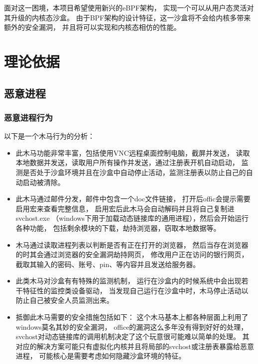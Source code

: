 \documentclass[AutoFakeBold,a4paper]{ctexart}
\begin{document}
面对这一困境，本项目希望使用新兴的eBPF架构，
实现一个可以从用户态灵活对其升级的内核态沙盒。
由于BPF架构的设计特征，这一沙盒将不会给内核多带来额外的安全漏洞，
并且将可以实现和内核态相仿的性能。

\section{理论依据}

\subsection{恶意进程}

\subsubsection{恶意进程行为}

以下是一个木马行为的分析：\cite{ZeuS2018}

\begin{itemize}
    \item 此木马功能非常丰富，包括使用VNC远程桌面控制电脑，截屏并发送，
    读取本地数据并发送，读取用户所有操作并发送，通过注册表开机自动启动，
    监测是否处于沙盒环境并且在沙盒中自动停止活动，监测注册表以防止自己的自动启动被清除。

    \item 此木马通过邮件分发，邮件中包含一个doc文件链接，
    打开后offic会提示需要启用宏来查看完整信息，
    启用宏后此木马会自动解码并且将自己复制进svchost.exe
    （windows下用于加载动态链接库的通用进程），然后会开始运行各种功能，
    包括剩余模块的下载，劫持浏览器，窃取本地数据等。
    
    \item 木马通过读取进程列表以判断是否有正在打开的浏览器，
    然后当存在浏览器的时其会通过浏览器的安全漏洞劫持网页，
    修改用户正在访问的银行网页，截取其输入的密码、账号、pin、等内容并且发送给服务器。
    
    \item 此类木马对沙盒有有特殊的监测机制，
    运行在沙盒内的时候系统中会出现若干特征性的监控类设备驱动，
    当发现自己运行在沙盒中时，木马停止活动以防止自己被安全人员监测出来。
    
    \item 抵御此木马需要的安全措施包括如下：
    这个木马基本上都各种层面上利用了windows莫名其妙的安全漏洞，
    office的漏洞这么多年没有得到好好的处理，
    svchost对动态链接库的调用机制决定了这个玩意很可能难以简单的处理。
    其对应的解决方案可能只有虚拟化内核并且将局部的svchost或注册表暴露给恶意进程，
    可能核心是需要考虑如何隐藏沙盒环境的特征。
\end{itemize}
\end{document}
